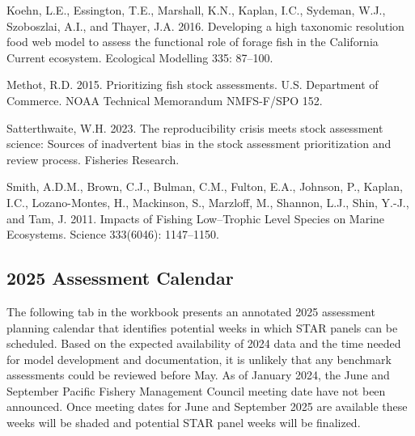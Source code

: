 \documentclass[11pt,
  english,
  a4paper,
]{article}
\newlength{\cslhangindent}
\newenvironment{CSLReferences}[2] %
 {%
  \setlength{\parindent}{0pt}
  \ifodd #1 \everypar{\setlength{\hangindent}{\cslhangindent}}\ignorespaces\fi
  \ifnum #2 > 0
  \setlength{\parskip}{#2\baselineskip}
  \fi
 }%
 {}
\begin{document}
\hypertarget{refs}{}
\begin{CSLReferences}{1}{0}
\leavevmode{}%
Koehn, L.E., Essington, T.E., Marshall, K.N., Kaplan, I.C., Sydeman, W.J., Szoboszlai, A.I., and Thayer, J.A. 2016. Developing a high taxonomic resolution food web model to assess the functional role of forage fish in the {California} {Current} ecosystem. Ecological Modelling 335: 87--100.

\leavevmode{}%
Methot, R.D. 2015. Prioritizing fish stock assessments. U.S. Department of Commerce. NOAA Technical Memorandum NMFS-F/SPO 152.

\leavevmode{}%
Satterthwaite, W.H. 2023. The reproducibility crisis meets stock assessment science: {Sources} of inadvertent bias in the stock assessment prioritization and review process. Fisheries Research.

\leavevmode{}%
Smith, A.D.M., Brown, C.J., Bulman, C.M., Fulton, E.A., Johnson, P., Kaplan, I.C., Lozano-Montes, H., Mackinson, S., Marzloff, M., Shannon, L.J., Shin, Y.-J., and Tam, J. 2011. Impacts of {Fishing} {Low}--{Trophic} {Level} {Species} on {Marine} {Ecosystems}. Science 333(6046): 1147--1150.

\end{CSLReferences}

\hypertarget{assessment-calendar}{%
\subsection{2025 Assessment Calendar}\label{assessment-calendar}}

The following tab in the workbook presents an annotated 2025 assessment planning calendar that identifies potential weeks in which STAR panels can be scheduled. Based on the expected availability of 2024 data and the time needed for model development and documentation, it is unlikely that any benchmark assessments could be reviewed before May. As of January 2024, the June and September Pacific Fishery Management Council meeting date have not been announced. Once meeting dates for June and September 2025 are available these weeks will be shaded and potential STAR panel weeks will be finalized.
\end{document}
